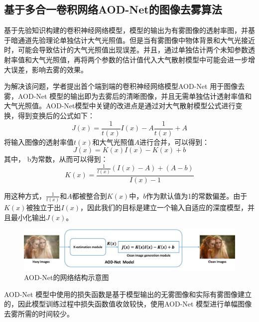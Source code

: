 \documentclass[12pt]{article}
\begin{document}
\subsection{基于多合一卷积网络AOD-Net的图像去雾算法}
基于先验知识构建的卷积神经网络模型，模型的输出为有雾图像的透射率图，并基于暗通道先验理论单独估计大气光照值。但是当有雾图像中物体背景和大气光接近时，可能会导致估计的大气光照值出现误差。并且，通过单独估计两个未知参数透射率值和大气光照值，再将两个参数的估计值代入大气散射模型中可能会进一步增大误差，影响去雾的效果。

为解决该问题，学者提出首个端到端的卷积神经网络模型AOD-Net 用于图像去雾，AOD-Net 模型的输出即为去雾后的清晰图像，并且无需单独估计透射率值和大气光照值。AOD-Net模型中关键的改进点是通过对大气散射模型公式进行变换，得到变换后的公式如下：
\begin{equation}J(x)=\frac{1}{t(x)} I(x)-A \frac{1}{t(x)}+A\end{equation}
将输入图像的透射率值$t(x)$和大气光照值$A$进行合并，可以得到：
\begin{equation}J(x)=K(x) I(x)-K(x)+b\end{equation}
其中， b为常数，从而可以得到：
\begin{equation}
    K(x)=\frac{{\frac{1}{t(x)}(I(x)-A)+(A-b)}}{I(x)-1}
\end{equation}

用这种方式，$\frac{1}{t(x)}$和$A$都被整合到$K(x)$中，$b$作为默认值为1的常数偏差。由于$K(x)$被独立于出$I(x)$，因此我们的目标是建立一个输入自适应的深度模型，并且最小化输出$J(x)$。
\begin{figure}[h]
    \centering
    \includegraphics[width=\textwidth]{pic/pic5}
    \caption{AOD-Net的网络结构示意图}
\end{figure}

AOD-Net 模型中使用的损失函数是基于模型输出的无雾图像和实际有雾图像建立的，因此模型训练过程中损失函数值收敛较快，使用AOD-Net 模型进行单幅图像去雾所需的时间较少。
\end{document}
